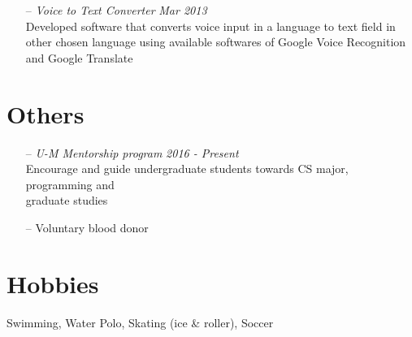 \documentclass[margin,line,letter]{resume}
\begin{document}
\begin{resume}
\begin{itemize}[leftmargin=*]
    \item[--] \textit{Voice to Text Converter} \hfill \emph{Mar 2013} \\ Developed software that converts voice input in a language to text field in other chosen language using available softwares of Google Voice Recognition and Google Translate
    

 

    \end{itemize}

\section{\mysidestyle Others}
    \noindent
    \begin{itemize}[leftmargin=*]
    \item[--] \textit{U-M Mentorship program} \hfill \emph{2016 - Present}\\
    Encourage and guide undergraduate students towards CS major, programming and \\ graduate studies
    \item[--] Voluntary blood donor
    \end{itemize}
    
\section{\mysidestyle Hobbies}
    Swimming, Water Polo, Skating (ice \& roller), Soccer

\end{resume}
\end{document}
